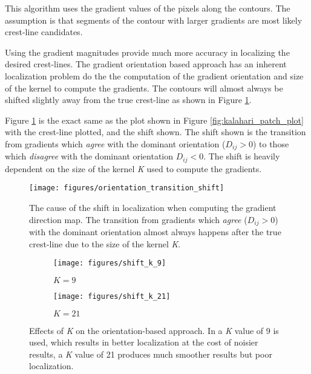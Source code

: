 This algorithm uses the gradient values of the pixels along the contours. The assumption is that segments of the contour with larger gradients are most likely crest-line candidates. 

Using the gradient magnitudes provide much more accuracy in localizing the desired crest-lines. The gradient orientation based approach has an inherent localization problem do the the computation of the gradient orientation and size of the kernel to compute the gradients. The contours will almost always be shifted slightly away from the true crest-line as shown in Figure \ref{fig:orientation_transition_shift}.

Figure \ref{fig:orientation_transition_shift} is the exact same as the plot shown in Figure \ref{fig:kalahari_patch_plot} with the crest-line plotted, and the shift shown. The shift shown is the transition from gradients which \emph{agree} with the dominant orientation ($D_{ij} > 0$) to those which \emph{disagree} with the dominant orientation {$D_{ij} < 0$}. The shift is heavily dependent on the size of the kernel \emph{K} used to compute the gradients.

\begin{figure}
	\centering
	\texttt{[image: figures/orientation\_transition\_shift]}
	\caption{The cause of the shift in localization when computing the gradient direction map. The transition from gradients which \emph{agree} ($D_{ij} > 0$) with the dominant orientation almost always happens after the true crest-line due to the size of the kernel \emph{K}.}
	\label{fig:orientation_transition_shift}
\end{figure}

\begin{figure}
	\centering
	\begin{subfigure}{0.48\textwidth}
		\centering
		\texttt{[image: figures/shift\_k\_9]}
		\caption{$K=9$}
		\label{fig:shift_k_9}
	\end{subfigure}
	\begin{subfigure}{0.48\textwidth}
		\centering
		\texttt{[image: figures/shift\_k\_21]}
		\caption{$K=21$}
		\label{fig:shift_k_21}
	\end{subfigure}
	\caption{Effects of \emph{K} on the orientation-based approach. In  a \emph{K} value of 9 is used, which results in better localization at the cost of noisier results,  a \emph{K} value of 21 produces much smoother results but poor localization. }
	\label{fig:effect_k}
\end{figure}

